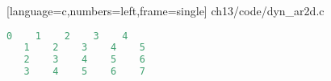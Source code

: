 \begin{frame}
  
  [language=c,numbers=left,frame=single]
  {ch13/code/dyn_ar2d.c}
\end{frame}



\begin{frame}[fragile]\ft{\secname}
  \begin{lstlisting}[language=c,backgroundcolor=\color{red!20}]
   0    1    2    3    4 
   1    2    3    4    5 
   2    3    4    5    6 
   3    4    5    6    7 
  \end{lstlisting}
\end{frame}
